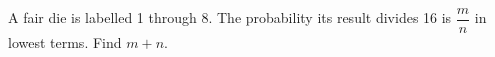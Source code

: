 A fair die is labelled 1 through 8. The probability its result divides 16 is $\dfrac{m}{n}$ in lowest terms. Find $m+n$.
